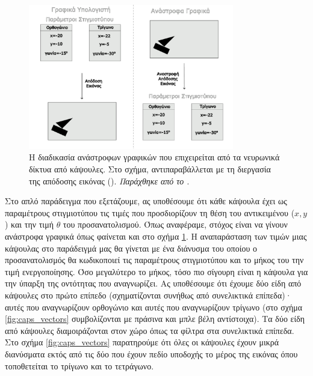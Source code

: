 \begin{figure}[p]
  \centering
  \includegraphics[width=0.8\textwidth]{images/chapter theoritical background/render_derender_gr.pdf}
  \caption{Η διαδικασία ανάστροφων γραφικών που επιχειρείται από τα νευρωνικά δίκτυα από κάψουλες. Στο σχήμα, αντιπαραβάλλεται με τη διεργασία της απόδοσης εικόνας (). \textit{Παράχθηκε από το \href{https://inkscape.org/}{}}.}
  \label{fig:render_derender}
\end{figure}

Στο απλό παράδειγμα που εξετάζουμε\cite{geron2019hands}, ας υποθέσουμε ότι κάθε κάψουλα έχει ως παραμέτρους στιγμιοτύπου τις τιμές που προσδιορίζουν τη θέση του αντικειμένου ($x,y$) και την τιμή $\theta$ του προσανατολισμού. Όπως αναφέραμε, στόχος είναι να γίνουν ανάστροφα γραφικά όπως φαίνεται και στο σχήμα \ref{fig:render_derender}. Η αναπαράσταση των τιμών μιας κάψουλας στο παράδειγμά μας θα γίνεται με ένα διάνυσμα του οποίου ο προσανατολισμός θα κωδικοποιεί τις παραμέτρους στιγμιοτύπου και το μήκος του την τιμή ενεργοποίησης. Όσο μεγαλύτερο το μήκος, τόσο πιο σίγουρη είναι η κάψουλα για την ύπαρξη της οντότητας που αναγνωρίζει. Ας υποθέσουμε ότι έχουμε δύο είδη από κάψουλες στο πρώτο επίπεδο (σχηματίζονται συνήθως από συνελικτικά επίπεδα)· αυτές που αναγνωρίζουν ορθογώνιο και αυτές που αναγνωρίζουν τρίγωνο (στο σχήμα \ref{fig:caps_vectors} συμβολίζονται με πράσινα και μπλε βέλη αντίστοιχα). Τα δύο είδη από κάψουλες διαμοιράζονται στον χώρο όπως τα φίλτρα στα συνελικτικά επίπεδα. Στο σχήμα \ref{fig:caps_vectors} παρατηρούμε ότι όλες οι κάψουλες έχουν μικρά διανύσματα εκτός από τις δύο που έχουν πεδίο υποδοχής το μέρος της εικόνας όπου τοποθετείται το τρίγωνο και το τετράγωνο. \par


